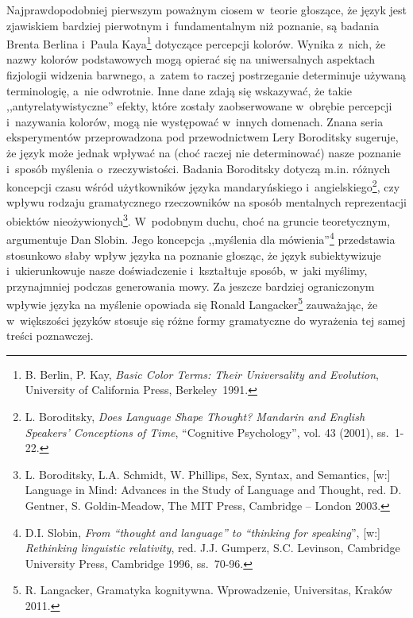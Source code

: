 Najprawdopodobniej pierwszym poważnym ciosem w~teorie głoszące, że język jest zjawiskiem bardziej pierwotnym i~fundamentalnym niż poznanie, są badania Brenta Berlina i~Paula Kaya\footnote{B. Berlin, P. Kay, \textit{Basic Color Terms: Their Universality and Evolution}, University of California Press, Berkeley~1991.} dotyczące percepcji kolorów. Wynika z~nich, że nazwy kolorów podstawowych mogą opierać się na uniwersalnych aspektach fizjologii widzenia barwnego, a~zatem to raczej postrzeganie determinuje używaną terminologię, a~nie odwrotnie. Inne dane zdają się wskazywać, że takie ,,antyrelatywistyczne'' efekty, które zostały zaobserwowane w~obrębie percepcji i~nazywania kolorów, mogą nie występować w~innych domenach. Znana seria eksperymentów przeprowadzona pod przewodnictwem Lery Boroditsky sugeruje, że język może jednak wpływać na (choć raczej nie determinować) nasze poznanie i~sposób myślenia o~rzeczywistości. Badania Boroditsky dotyczą m.in. różnych koncepcji czasu wśród użytkowników języka mandaryńskiego i~angielskiego\footnote{L. Boroditsky, \textit{Does Language Shape Thought? Mandarin and English Speakers' Conceptions of Time}, ``Cognitive Psychology'', vol. 43 (2001), ss.~1-22.}, czy wpływu rodzaju gramatycznego rzeczowników na sposób mentalnych reprezentacji obiektów nieożywionych\footnote{L. Boroditsky, L.A. Schmidt, W. Phillips, Sex, Syntax, and Semantics, [w:] Language in Mind: Advances in the Study of Language and Thought, red. D. Gentner, S. Goldin-Meadow, The MIT Press, Cambridge -- London 2003.}. W~podobnym duchu, choć na gruncie teoretycznym, argumentuje Dan Slobin. Jego koncepcja ,,myślenia dla mówienia''\footnote{D.I. Slobin, \textit{From ``thought and language'' to ``thinking for speaking}'', [w:] \textit{Rethinking linguistic relativity}, red. J.J. Gumperz, S.C. Levinson, Cambridge University Press, Cambridge 1996, ss.~70-96.} przedstawia stosunkowo słaby wpływ języka na poznanie głosząc, że język subiektywizuje i~ukierunkowuje nasze doświadczenie i~kształtuje sposób, w~jaki myślimy, przynajmniej podczas generowania mowy. Za jeszcze bardziej ograniczonym wpływie języka na myślenie opowiada się Ronald Langacker\footnote{R. Langacker, Gramatyka kognitywna. Wprowadzenie, Universitas, Kraków 2011.} zauważając, że w~większości języków stosuje się różne formy gramatyczne do wyrażenia tej samej treści poznawczej.

